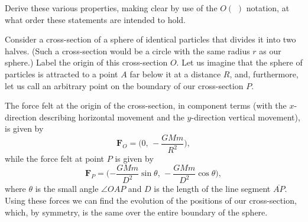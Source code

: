 \documentclass[../the-road-to-reality.tex]{subfiles}
\begin{document}
\begin{questions}
	\question Derive these various properties, making clear by use of the $O(\,\,)$ notation, at what order these statements are intended to hold.

	\begin{solution}
		Consider a cross-section of a sphere of identical particles that divides it into two halves. (Such a cross-section would be a circle with the same radius $r$ as our sphere.) Label the origin of this cross-section $O$. Let us imagine that the sphere of particles is attracted to a point $A$ far below it at a distance $R$, and, furthermore, let us call an arbitrary point on the boundary of our cross-section $P$.	

		The force felt at the origin of the cross-section, in component terms (with the $x$-direction describing horizontal movement and the $y$-direction vertical movement), is given by
		\[
			\mathbf{F}_O = \Big(0,\, -\frac{GMm}{R^2}\Big)
		,\] 
		while the force felt at point $P$ is given by
		\[
			\mathbf{F}_P = \Big({-\frac{GMm}{D^2}\sin\theta},\, -\frac{GMm}{D^2}\cos\theta\Big)
		,\] 
		where $\theta$ is the small angle $\angle{OAP}$ and $D$ is the length of the line segment $\overline{AP}$. Using these forces we can find the evolution of the positions of our cross-section, which, by symmetry, is the same over the entire boundary of the sphere.


\end{solution}
\end{questions}
\end{document}
